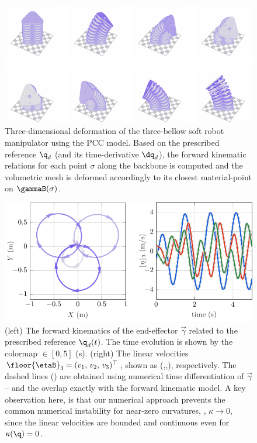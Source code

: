 \begin{figure}[!h]
   \centering
   \vspace{-5mm}
   \includegraphics*{./pdf/thesis-figure-4-4.pdf}
   \caption{Three-dimensional deformation of the three-bellow soft robot manipulator using the PCC model. Based on the prescribed reference $\q_d$ (and its time-derivative $\dq_d$), the forward kinematic relations for each point $\sigma$ along the backbone is computed and the volumetric mesh is deformed accordingly to its closest material-point on $\gammaB(\sigma)$.}
   \vspace{-0.1cm}
   \label{fig:C2:EX1:strain_ref_3D}
 \end{figure}
 \begin{figure}[!t]
  \pgfplotsset{colormap name=barney}
  \includegraphics*{./pdf/thesis-figure-4-5.pdf}
  \caption{(left) The forward kinematics of the end-effector $\vec{\gamma}$ related to the prescribed reference $\q_d(t)$. The time evolution is shown by the colormap \protect{}$\!\!\in [0,5]$ (s). (right) The linear velocities $\floor{\etaB}_3 = (v_1,\,v_2,\,v_3)^\top$, shown as (,,), respectively. The dashed lines () are obtained using numerical time differentiation of $\vec{\gamma}$ -- and the overlap exactly with the forward kinematic model. A key observation here, is that our numerical approach prevents the common numerical instability for near-zero curvatures, \ie, $\kappa \to 0$, since the linear velocities are bounded and continuous even for $\kappa(\q) = 0$. }
  \label{fig:C2:EX1:strain_ref_FK}
\end{figure}
\clearpage

